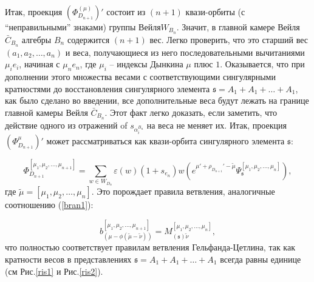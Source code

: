 \documentclass[12pt]{article}
\newcommand{\sfr}{\mathfrak{s}}
\begin{document}
Итак, проекция $(\Phi^{(\mu)}_{D_{n+1}})'$ состоит из  $(n+1)$ квази-орбиты (с  ``неправильными''
знаками) группы Вейля$W_{B_{n}}$. Значит, в главной камере Вейля  $\bar C_{B_n}$ алгебры
$B_n$ содержится
$(n+1)$ вес.  Легко проверить, что это старший вес  $(a_1,a_2,\dots,a_{n})$ и веса, получающиеся из
него последовательными вычитаниями $\mu_i e_i$, начиная с $\mu_n e_n$, где  $\mu_i$ -- индексы
Дынкина  $\mu$ плюс $1$. Оказывается, что при дополнении этого множества  весами с
соответствующими сингулярными кратностями до восстановления сингулярного элемента
$\sfr=A_1+A_1+\dots+A_1$, как было сделано во введении, все дополнительные веса будут лежать на
границе главной камеры Вейля $\bar C_{B_n}$. Этот факт легко доказать, если заметить, что действие
одного из отражений of $s_{\alpha_i^{B_n}}$ на веса не меняет их. Итак, проекция
$(\Phi^{\mu}_{D_{n+1}})'$ может рассматриваться как квази-орбита сингулярного элемента $\sfr$:

\begin{equation}
\Phi^{[\mu_1,\mu_2,\dots,\mu_{n+1}]}_{D_{n+1}}=\sum_{w\in W_{D_n}} \varepsilon(w) (1+s_{e_n})w (e^{\mu'+\rho_{D_{n+1}}'-\tilde\mu}\Psi^{[\mu_1,\mu_2,\dots,\mu_{n}]}_{\sfr}),
\end{equation}
где $\tilde\mu=[\mu_1,\mu_2,\dots,\mu_{n}]$. Это порождает  правила ветвления, аналогичные соотношению (\ref{bran1}):

\begin{equation}
b_{\left( \mu -\phi \left( \widetilde{\mu }-\widetilde{\nu }\right) \right)
}^{[\mu_1,\mu_2,\dots,\mu_{n+1}]}=M_{\left( \sfr\right) \widetilde{\nu }}^{[\mu_1,\mu_2,\dots,\mu_{n}]}, 
\label{bran11}
\end{equation}
что полностью соответствует правилам ветвления Гельфанда-Цетлина, так как кратности весов в
представлениях  $\sfr=A_1+A_1+\dots+A_1$ всегда равны единице (см Рис.\ref{ris1} и Рис.\ref{ris2}).
\end{document}
